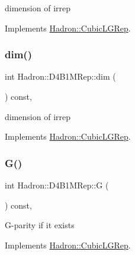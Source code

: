 dimension of irrep 

Implements \mbox{\hyperlink{structHadron_1_1CubicLGRep_a3acbaea26503ed64f20df693a48e4cdd}{Hadron\+::\+Cubic\+L\+G\+Rep}}.

\mbox{\label{structHadron_1_1D4B1MRep_a157803c0c4f71990cbc71bd4f37f3254}} 
\subsubsection{\texorpdfstring{dim()}{dim()}\hspace{0.1cm}{\footnotesize\ttfamily [3/3]}}
{\footnotesize\ttfamily int Hadron\+::\+D4\+B1\+M\+Rep\+::dim (\begin{DoxyParamCaption}{ }\end{DoxyParamCaption}) const\hspace{0.3cm}{\ttfamily [inline]}, {\ttfamily [virtual]}}

dimension of irrep 

Implements \mbox{\hyperlink{structHadron_1_1CubicLGRep_a3acbaea26503ed64f20df693a48e4cdd}{Hadron\+::\+Cubic\+L\+G\+Rep}}.

\mbox{\label{structHadron_1_1D4B1MRep_a43f4d688952f8690788611d18abc6d28}} 
\subsubsection{\texorpdfstring{G()}{G()}\hspace{0.1cm}{\footnotesize\ttfamily [1/3]}}
{\footnotesize\ttfamily int Hadron\+::\+D4\+B1\+M\+Rep\+::G (\begin{DoxyParamCaption}{ }\end{DoxyParamCaption}) const\hspace{0.3cm}{\ttfamily [inline]}, {\ttfamily [virtual]}}

G-\/parity if it exists 

Implements \mbox{\hyperlink{structHadron_1_1CubicLGRep_ace26f7b2d55e3a668a14cb9026da5231}{Hadron\+::\+Cubic\+L\+G\+Rep}}.

\mbox{\label{structHadron_1_1D4B1MRep_a43f4d688952f8690788611d18abc6d28}} 
